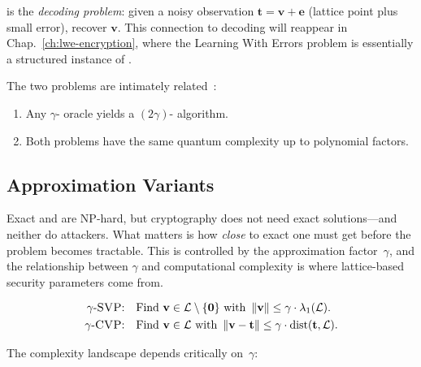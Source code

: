 \cvp{} is the \emph{decoding problem}: given a noisy observation $\mathbf{t} = \mathbf{v} + \mathbf{e}$ (lattice point plus small error), recover $\mathbf{v}$.  This connection to decoding will reappear in Chap.~\ref{ch:lwe-encryption}, where the Learning With Errors problem is essentially a structured instance of \cvp{}.

\begin{theorem}
\label{thm:svp-cvp}
The two problems are intimately related~\cite{MicciancioGoldwasser2002}:
\begin{enumerate}
\item Any $\gamma$-\cvp{} oracle yields a $(2\gamma)$-\svp{} algorithm.
\item Both problems have the same quantum complexity up to polynomial factors.
\end{enumerate}
\end{theorem}


\subsection{Approximation Variants}
\label{subsec:approx-variants}

Exact \svp{} and \cvp{} are NP-hard, but cryptography does not need exact solutions---and neither do attackers.  What matters is how \emph{close} to exact one must get before the problem becomes tractable.  This is controlled by the approximation factor~$\gamma$, and the relationship between $\gamma$ and computational complexity is where lattice-based security parameters come from.

\begin{definition}
\label{def:approx-svp-cvp}
\begin{align}
\gamma\text{-\textsc{SVP}{}:}\quad & \text{Find } \mathbf{v}\in\mathcal{L}\setminus\{\mathbf{0}\} \text{ with } \left\lVert \mathbf{v} \right\rVert \leq \gamma\cdot\lambda_1(\mathcal{L}). \\
\gamma\text{-\textsc{CVP}{}:}\quad & \text{Find } \mathbf{v}\in\mathcal{L} \text{ with } \left\lVert \mathbf{v}-\mathbf{t} \right\rVert \leq \gamma\cdot\mathrm{dist}(\mathbf{t},\mathcal{L}).
\end{align}
\end{definition}

The complexity landscape depends critically on~$\gamma$:

